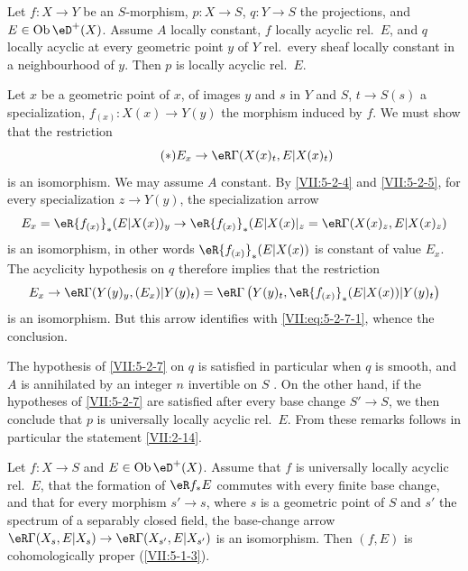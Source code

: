 \begin{corollary}\label{VII:5-2-7}
Let $f:X\to Y$ be an $S$-morphism, $p:X\to S$, $q:Y\to S$ the projections, and
$E\in\ob\eD^+(X)$. Assume $A$ locally constant, $f$ locally acyclic
rel.\ $E$, and $q$ locally acyclic at every geometric point $y$ of
$Y$ rel.\ every sheaf locally constant in a neighbourhood of $y$. Then $p$
is locally acyclic rel.\ $E$.
\end{corollary}

Let $x$ be a geometric point of $x$, of images $y$ and $s$ in $Y$ and
$S$, $t\to S(s)$ a specialization, $f_{(x)}:X(x)\to Y(y)$ the morphism
induced by $f$. We must show that the restriction
\begin{equation*}\tag{$*$}\label{VII:eq:5-2-7-1}
  E_x \to \eR\Gamma(X(x)_t,E|X(x)_t)
\end{equation*}
is an isomorphism. We may assume $A$ constant. By \ref{VII:5-2-4} and
\ref{VII:5-2-5}, for every specialization $z\to Y(y)$, the
specialization arrow
\[
  E_x = \eR {f_{(x)}}_\ast (E|X(x))_y \to \eR {f_{(x)}}_\ast (E|X(x)|_z = \eR\Gamma(X(x)_z,E|X(x)_z)
\]
is an isomorphism, in other words $\eR{f_{(x)}}_\ast(E|X(x))$ is constant of
value $E_x$. The acyclicity hypothesis on $q$ therefore implies that the
restriction
\[
  E_x \to \eR\Gamma(Y(y)_y,(E_x)|Y(y)_t) = \eR\Gamma\left(Y(y)_t,\eR {f_{(x)}}_\ast (E|X(x))|Y(y)_t\right)
\]
is an isomorphism. But this arrow identifies with
\eqref{VII:eq:5-2-7-1}, whence the conclusion.

The hypothesis of \ref{VII:5-2-7} on $q$ is satisfied in particular when $q$
is smooth, and $A$ is annihilated by an integer $n$ invertible on $S$
\cite[XV]{sga4}. On the other hand, if the hypotheses of \ref{VII:5-2-7} are
satisfied after every base change $S'\to S$, we then conclude that
$p$ is universally locally acyclic rel.\ $E$. From these remarks
follows in particular the statement \ref{VII:2-14}.




\begin{corollary}\label{VII:5-2-8}
Let $f:X\to S$ and $E\in \ob\eD^+(X)$. Assume that $f$ is universally
locally acyclic rel.\ $E$, that the formation of $\eR f_\ast E$ commutes
with every finite base change, and that for every morphism $s'\to s$, where
$s$ is a geometric point of $S$ and $s'$ the spectrum of a
separably closed field, the base-change arrow
$\eR\Gamma(X_s,E|X_s)\to \eR\Gamma(X_{s'},E|X_{s'})$ is an isomorphism.
Then $(f,E)$ is cohomologically proper (\ref{VII:5-1-3}).
\end{corollary}

